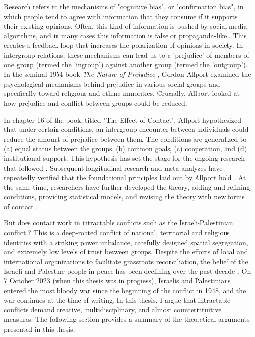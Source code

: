 \documentclass[dissertation,math,vertlayout,pdfa,colorlinks,nologo]{aaltoseries}
\begin{document}
Research refers to the mechanisms of "cognitive bias", or "confirmation bias", in which people tend to agree with information that they consume if it supports their existing opinions. Often, this kind of information is pushed by social media algorithms, and in many cases this information is false or propaganda-like \cite{eckerDigitalReinforcementBias2025}. This creates a feedback loop that increases the polarization of opinions in society. In intergroup relations, these mechanisms can lead us to a 'prejudice' of members of one group (termed the 'ingroup') against another group (termed the 'outgroup'). In the seminal 1954 book \textit{The Nature of Prejudice} \cite{allportNaturePrejudice1954}, Gordon Allport examined the psychological mechanisms behind prejudice in various social groups and specifically toward religious and ethnic minorities. Crucially, Allport looked at how prejudice and conflict between groups could be reduced. 

In chapter 16 of the book, titled "The Effect of Contact", Allport hypothesized that under certain conditions, an intergroup encounter between individuals could reduce the amount of prejudice between them. The conditions are generalized to (a) equal status between the groups, (b) common goals, (c) cooperation, and (d) institutional support. This hypothesis has set the stage for the ongoing research that followed \cite{pettigrewAllportsIntergroupContact2005}. Subsequent longitudinal research and meta-analyzes have repeatedly verified that the foundational principles laid out by Allport hold \cite{pettigrewMetaanalyticTestIntergroup2006, pettigrewIntergroupContactTheory1998, pettigrewDoesIntergroupContact2013}. At the same time, researchers have further developed the theory, adding and refining conditions, providing statistical models, and revising the theory with new forms of contact \cite{pettigrewAdvancingIntergroupContact2021}.

But does contact work in intractable conflicts such as the Israeli-Palestinian conflict \cite{bar-talIntractableConflictsSociopsychological2013,maozDoesContactWork2011}? This is a deep-rooted conflict of national, territorial and religious identities with a striking power imbalance, carefully designed spatial segregation, and extremely low levels of trust between groups. Despite the efforts of local and international organizations to facilitate grassroots reconciliation, the belief of the Israeli and Palestine people in peace has been declining over the past decade \cite{cavatortaAnalysisChangingIsraeli2024}. On 7 October 2023 (when this thesis was in progress), Israelis and Palestinians entered the most bloody war since the beginning of the conflict in 1948, and the war continues at the time of writing. In this thesis, I argue that intractable conflicts demand creative, multidisciplinary, and almost counterintuitive measures. The following section provides a summary of the theoretical arguments presented in this thesis.
\end{document}
